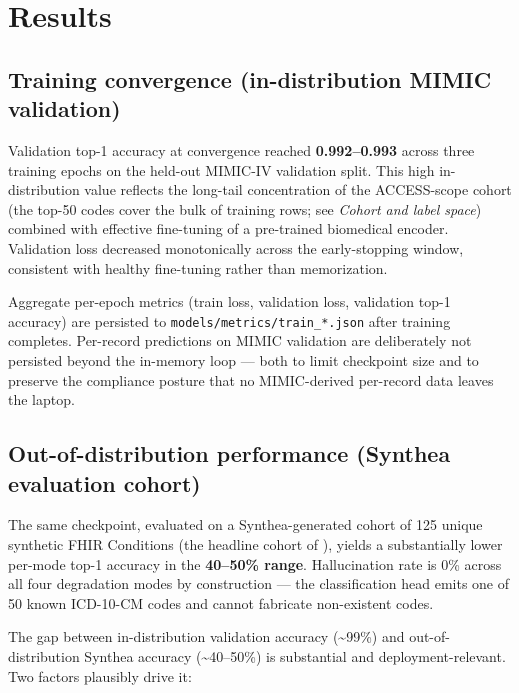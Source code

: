 \section{Results}\label{results}

\subsection{Training convergence (in-distribution MIMIC validation)}\label{training-convergence-in-distribution-mimic-validation}

Validation top-1 accuracy at convergence reached \textbf{0.992--0.993}
across three training epochs on the held-out MIMIC-IV validation
split. This high in-distribution value reflects the long-tail
concentration of the ACCESS-scope cohort (the top-50 codes cover
the bulk of training rows; see \emph{Cohort and label space}) combined
with effective fine-tuning of a pre-trained biomedical encoder.
Validation loss decreased monotonically across the early-stopping
window, consistent with healthy fine-tuning rather than
memorization.

Aggregate per-epoch metrics (train loss, validation loss,
validation top-1 accuracy) are persisted to
\texttt{models/metrics/train\_*.json} after training completes. Per-record
predictions on MIMIC validation are deliberately not persisted
beyond the in-memory loop --- both to limit checkpoint size and to
preserve the compliance posture that no MIMIC-derived per-record
data leaves the laptop.

\subsection{Out-of-distribution performance (Synthea evaluation cohort)}\label{out-of-distribution-performance-synthea-evaluation-cohort}

The same checkpoint, evaluated on a Synthea-generated cohort of
125 unique synthetic FHIR Conditions (the headline cohort of
\autocite{FungPhantomCodes2026}), yields a substantially lower per-mode
top-1 accuracy in the \textbf{40--50\% range}. Hallucination rate is 0\%
across all four degradation modes by construction --- the
classification head emits one of 50 known ICD-10-CM codes and
cannot fabricate non-existent codes.

The gap between in-distribution validation accuracy (\textasciitilde99\%) and
out-of-distribution Synthea accuracy (\textasciitilde40--50\%) is substantial and
deployment-relevant. Two factors plausibly drive it:

